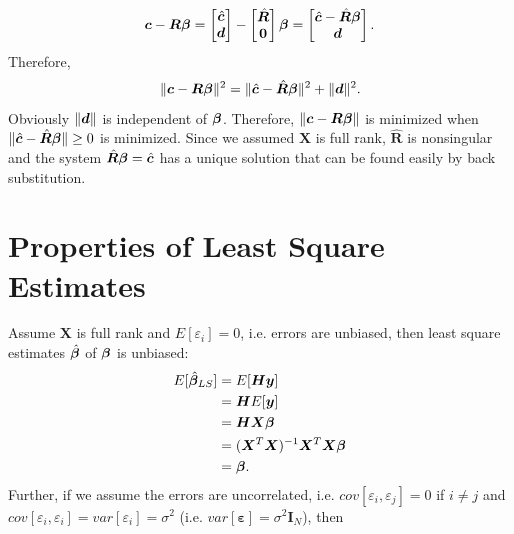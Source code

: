 \[ \bm c - \bm R \bm \beta =  
\begin{bmatrix} \hat {\bm c} \\ \bm d  \end{bmatrix}  - \begin{bmatrix} \hat{\bm R} \\ \bm 0 \end{bmatrix} \bm \beta = \begin{bmatrix} \hat {\bm c} - \hat{\bm R} \bm \beta \\ \bm d  \end{bmatrix}.
\]
Therefore, 
\[\lVert{\bm c - \bm R \bm \beta}\rVert^2 = \lVert{\hat {\bm c} - \hat{\bm R} \bm \beta}\rVert^2 + \lVert{\bm d}\rVert^2.\]
Obviously $\lVert{\bm d}\rVert$ is independent of $\bm \beta$.
Therefore, $\lVert{\bm c - \bm R \bm \beta}\rVert$ is minimized when
$\lVert{\hat {\bm c} - \hat{\bm R} \bm \beta}\rVert \ge 0$ is minimized.
Since we assumed $\bm X$ is full rank, $\hat{\bm R}$ is nonsingular
and the system $\hat{\bm R} \bm \beta = \hat {\bm c} $ has a unique 
solution that can be found easily by back substitution.




\section{Properties of Least Square Estimates}
\label{sec:Properties-of-Least-Square-Estimates}
Assume $\bm X$ is full rank and $E[\varepsilon_i] = 0$, 
i.e. errors are unbiased, then least square 
estimates $\hat {\bm \beta}$ of $\bm \beta$
is unbiased:
\begin{equation*}
\begin{aligned}
E[\hat {\bm \beta}_{LS}] &= E[\bm H \bm y]\\
                      &= \bm H E[ \bm y]\\
                      &= \bm H \bm X \bm \beta \\
                      &= {(\bm X^T \bm X)^{-1} \bm X^T} \bm X \bm \beta \\
                      &= \bm \beta.
\end{aligned}
\end{equation*}
Further, if we assume the errors are uncorrelated, i.e.
$cov[\varepsilon_i, \varepsilon_j] = 0$ if $i \neq j$ and 
$cov[\varepsilon_i, \varepsilon_i] =  var[\varepsilon_i] = \sigma^2$ 
(i.e. $var[\bm \varepsilon] = \sigma^2 {\bm I}_N$), then

